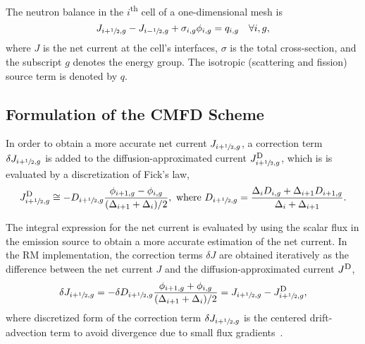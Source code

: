 \documentclass[letterpaper]{mc2021}
\newcommand{\tsup}[1]{\textsuperscript{#1}}
\newcommand{\hzi}{\ensuremath{\sfrac{1}{2}}}
\newcommand{\jD}{\ensuremath{J^{\textrm{\scriptsize{D}}}}}
\begin{document}
The neutron balance in the $i$\tsup{th} cell of a one-dimensional mesh is
\begin{equation}
\label{eq:balance}
J_{i+\hzi,g} - J_{i-\hzi,g} + \sigma_{i,g} \phi_{i,g} = q_{i,g} \quad \forall i,g,
\end{equation}
where $J$ is the net current at the cell's interfaces, $\sigma$ is the total cross-section, and the subscript $g$ denotes the energy group. The isotropic (scattering and fission) source term is denoted by $q$.

\vspace{-1.5mm}

\subsection{Formulation of the CMFD Scheme} 
\label{sec:cmfd}

In order to obtain a more accurate net current $J_{i+\hzi,g}$, a correction term $\delta J_{i+\hzi,g}$ is added to the diffusion-approximated current $\jD_{i+\hzi,g}$, which is is evaluated by a discretization of Fick's law, 
\begin{equation}
\label{eq:JD}
\jD_{i+\hzi,g} \cong - D_{i+\hzi,g}
\frac{\phi_{i+1,g} - \phi_{i,g}}{(\Delta_{i+1} + \Delta_i)/2},
\,\, \text{where }
D_{i+\hzi,g} = \frac{\Delta_i D_{i,g} + \Delta_{i+1} D_{i+1,g}}
{\Delta_i + \Delta_{i+1}}.
\end{equation}

\vspace{-2.5mm}

The integral expression for the net current is evaluated by using the scalar flux in the emission source to obtain a more accurate estimation of the net current. In the RM implementation, the correction terms $\delta J$ are obtained  iteratively as the difference between the net current $J$ and the diffusion-approximated current $\jD$, 
\begin{equation}
\label{eq:dJ}
\delta J_{i+\hzi,g} = -\delta D_{i+\hzi,g}
\frac{\phi_{i+1,g} + \phi_{i,g}}{(\Delta_{i+1} + \Delta_i)/2} =
J_{i+\hzi,g} - \jD_{i+\hzi,g},
\end{equation}
where discretized form of the correction term $\delta J_{i+\hzi,g}$ is the centered drift-advection term to avoid divergence due to small flux gradients~\cite{Tomatis-2011,Smith-1983}.
\end{document}
